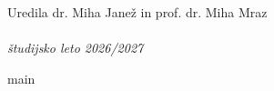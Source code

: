 \documentclass[graybox, envcountchap]{svmult}
\begin{document}
\large Uredila dr. Miha Janež in prof. dr. Miha Mraz\\
\\
\normalsize \emph{študijsko leto 2026/2027}




\tableofcontents

{main}

\backmatter

\end{document}
